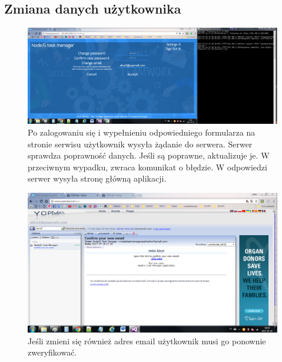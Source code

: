 \documentclass[12pt]{report}
\begin{document}
\subsection{Zmiana danych użytkownika}
\begin{figure}[!hb]
\centering
\includegraphics[width=\textwidth,height=\textheight,keepaspectratio]{62.png}
\captionsetup{labelformat=empty}
\caption[]{Po zalogowaniu się i wypełnieniu odpowiedniego formularza na stronie serwisu użytkownik wysyła żądanie do serwera. 
Serwer sprawdza poprawność danych. Jeśli są poprawne, aktualizuje je.
W przeciwnym wypadku, zwraca komunikat o błędzie. 
W odpowiedzi serwer wysyła stronę główną aplikacji.}
\end{figure}
\begin{figure}[!hb]
\centering
\includegraphics[width=\textwidth,height=\textheight,keepaspectratio]{63.png}
\captionsetup{labelformat=empty}
\caption[]{Jeśli zmieni się również adres email użytkownik musi go ponownie zweryfikować. }
\end{figure}

\newpage 
\end{document}
